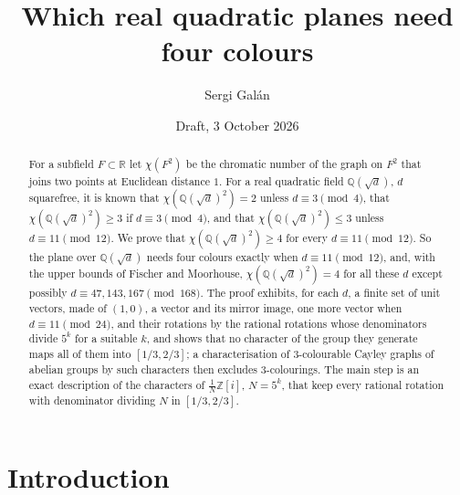 \documentclass[11pt,a4paper]{amsart}
\title{Which real quadratic planes need four colours}
\author{Sergi Gal\'an}
\date{Draft, 3 October 2026}
\theoremstyle{remark}
\newcommand{\Q}{\mathbb{Q}}
\newcommand{\R}{\mathbb{R}}
\newcommand{\Z}{\mathbb{Z}}
\begin{document}
\begin{abstract}
For a subfield $F\subset\R$ let $\chi(F^2)$ be the chromatic number of the graph on $F^2$ that joins two points at
Euclidean distance $1$. For a real quadratic field $\Q(\sqrt d)$, $d$ squarefree, it is known that
$\chi(\Q(\sqrt d)^2)=2$ unless $d\equiv 3\pmod 4$, that $\chi(\Q(\sqrt d)^2)\ge3$ if $d\equiv3\pmod 4$, and that
$\chi(\Q(\sqrt d)^2)\le 3$ unless $d\equiv 11\pmod{12}$. We prove that $\chi(\Q(\sqrt d)^2)\ge 4$ for every
$d\equiv 11\pmod{12}$. So the plane over $\Q(\sqrt d)$ needs four colours exactly when $d\equiv11\pmod{12}$, and,
with the upper bounds of Fischer and Moorhouse, $\chi(\Q(\sqrt d)^2)=4$ for all these $d$ except possibly
$d\equiv 47,143,167\pmod{168}$. The proof exhibits, for each $d$, a finite set of unit vectors, made of $(1,0)$, a
vector and its mirror image, one more vector when $d\equiv11\pmod{24}$, and their rotations by the rational rotations
whose denominators divide $5^k$ for a suitable $k$, and shows that no
character of the group they generate maps all of them into $[1/3,2/3]$; a characterisation of $3$-colourable
Cayley graphs of abelian groups by such characters then excludes $3$-colourings. The main step is an exact
description of the characters of $\frac1N\Z[i]$, $N=5^k$, that keep every rational rotation with denominator
dividing $N$ in $[1/3,2/3]$.
\end{abstract}

\maketitle

\section{Introduction}
\end{document}
